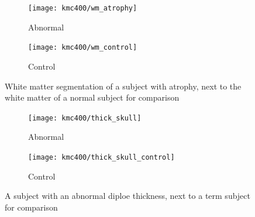 \begin{figure}
	\centering
	\begin{subfigure}{0.45\textwidth}
		\texttt{[image: kmc400/wm\_atrophy]}
		\caption{Abnormal}
	\end{subfigure}
	\begin{subfigure}{0.45\textwidth}
		\texttt{[image: kmc400/wm\_control]}
		\caption{Control}
	\end{subfigure}
	\caption{White matter segmentation of a subject with atrophy, next to the white matter of a normal subject for comparison}
	\label{fig_white_matter}
\end{figure}

\begin{figure}
	\centering
	\begin{subfigure}{0.45\textwidth}
		\texttt{[image: kmc400/thick\_skull]}
		\caption{Abnormal}
	\end{subfigure}
	\begin{subfigure}{0.45\textwidth}
		\texttt{[image: kmc400/thick\_skull\_control]}
		\caption{Control}
	\end{subfigure}
	\caption{A subject with an abnormal diploe thickness, next to a term subject for comparison}
	\label{fig_diploe}
\end{figure}
